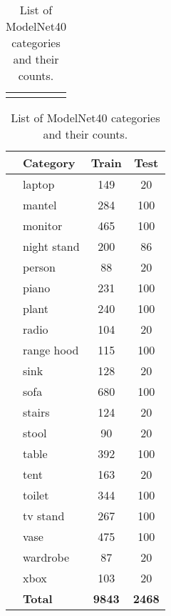 \begin{table}[]
\begin{tabular}[t]{lccl}
		                  &                &
	\end{tabular}
     \bigskip
	\begin{tabular}[t]{llcc}
		\hline
		\hspace{4pt} & \textbf{Category} & \textbf{Train} & \textbf{Test} \\ \hline
		             & laptop            & 149            & 20            \\
		             & mantel            & 284            & 100           \\
		             & monitor           & 465            & 100           \\
		             & night stand       & 200            & 86            \\
		             & person            & 88             & 20            \\
		             & piano             & 231            & 100           \\
		             & plant             & 240            & 100           \\
		             & radio             & 104            & 20            \\
		             & range hood        & 115            & 100           \\
		             & sink              & 128            & 20            \\
		             & sofa              & 680            & 100           \\
		             & stairs            & 124            & 20            \\
		             & stool             & 90             & 20            \\
		             & table             & 392            & 100           \\
		             & tent              & 163            & 20            \\
		             & toilet            & 344            & 100           \\
		             & tv stand          & 267            & 100           \\
		             & vase              & 475            & 100           \\
		             & wardrobe          & 87             & 20            \\
		             & xbox              & 103            & 20            \\
		             & \textbf{Total}    & \textbf{9843 } & \textbf{2468} \\ \hline

	\end{tabular}
	
	\caption{List of ModelNet40 categories and their counts.}
	\label{Table:modelnetcats}
\end{table}